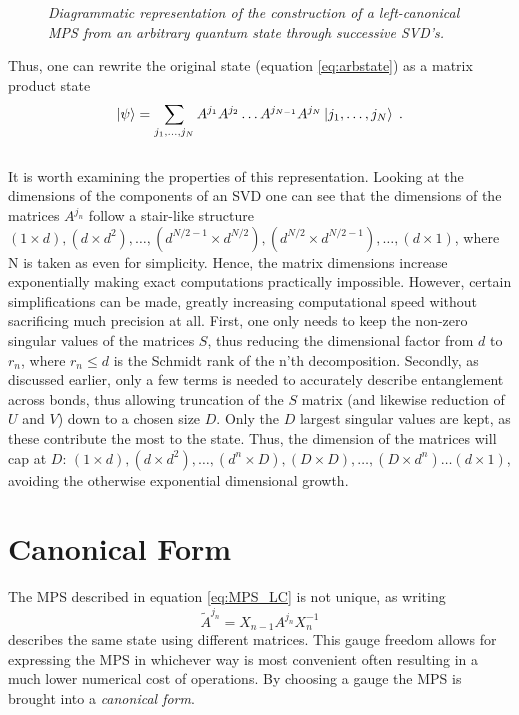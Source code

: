 \begin{figure}[h!]
	\centering
	
	\caption{\textit{Diagrammatic representation of the construction of a left-canonical MPS from an arbitrary quantum state through successive SVD's.}}
	\label{fig:MPSbuild}
\end{figure}
Thus, one can rewrite the original state (equation \ref{eq:arbstate}) as a matrix product state \cite{Schollwock}
\begin{equation}
	\ket{\psi} = \sum_{j_1, \ldots, j_N} A^{j_1} A^{j_2} \ldots A^{j_{N-1}} A^{j_{N}} \ket{j_1, \ldots, j_N} \; .
	\label{eq:MPS_LC} 
\end{equation}
\\
It is worth examining the properties of this representation. Looking at the dimensions of the components of an SVD one can see that the dimensions of the matrices $A^{j_n}$ follow a stair-like structure $(1 \times d ),(d \times d^2) , \ldots , (d^{N/2 -1} \times d^{N/2}) , (d^{N/2} \times d^{N/2 -1 }), \ldots , (d \times 1)$, where N is taken as even for simplicity. Hence, the matrix dimensions increase exponentially making exact computations practically impossible. However, certain simplifications can be made, greatly increasing computational speed without sacrificing much precision at all. First, one only needs to keep the non-zero singular values of the matrices $S$, thus reducing the dimensional factor from $d$ to $r_n$, where $r_n \leq d$ is the Schmidt rank of the n'th decomposition. Secondly, as discussed earlier, only a few terms is needed to accurately describe entanglement across bonds, thus allowing truncation of the $S$ matrix (and likewise reduction of $U$ and $V$) down to a chosen size $D$. Only the $D$ largest singular values are kept, as these contribute the most to the state. Thus, the dimension of the matrices will cap at $D$: $(1 \times d ),(d \times d^2) , \ldots , (d^{n} \times D) , (D \times D), \ldots , ( D \times d^{n}) \ldots  (d \times 1)$, avoiding the otherwise exponential dimensional growth. \cite{EntropyScaling}



\section{Canonical Form}
The MPS described in equation \ref{eq:MPS_LC} is not unique, as writing 
\begin{equation}
	\tilde{A}^{j_n} = X_{n-1} A^{j_n} X_{n}^{-1}
\end{equation}
describes the same state using different matrices. This gauge freedom allows for expressing the MPS in whichever way is most convenient often resulting in a much lower numerical cost of operations. By choosing a gauge the MPS is brought into a \textit{canonical form}. \cite{Vidal}

